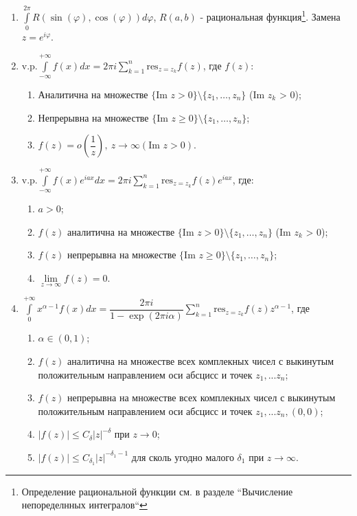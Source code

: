 \documentclass[a4paper,12pt]{scrartcl}
\newcommand{\res}{\text{res}}
\begin{document}
\begin{enumerate}
 \item $\int\limits_{0}^{2\pi}R(\sin(\varphi),\cos(\varphi))d\varphi$, $R(a,b)$ - рациональная функция\footnote{Определение рациональной функции см. в разделе ``Вычисление непоределнных интегралов``}. Замена $z=e^{i\varphi}$.
\item v.p.$\int\limits_{-\infty}^{+\infty}f(x)dx =2\pi i\sum\limits_{k=1}^{n}\res_{z=z_k}f(z)$, где $f(z)$:
\begin{enumerate}
\item Аналитична на множестве $\{\text{Im } z > 0\} \setminus \{z_1,\ldots,z_n\}$ (Im $z_k$ > 0);
\item Непрерывна на множестве $\{\text{Im } z \geqslant 0 \} \setminus \{z_1,\ldots,z_n\}$;
\item $f(z) = o\left(\dfrac{1}{z}\right),\ z\to\infty (\text{Im } z >0)$.
\end{enumerate}
\item v.p.$\int\limits_{-\infty}^{+\infty}f(x)e^{iax}dx =2\pi i\sum\limits_{k=1}^{n}\res_{z=z_k}f(z)e^{iax}$, где:
\begin{enumerate}
\item $a > 0$;
\item $f(z)$ аналитична на множестве $\{\text{Im } z > 0\} \setminus \{z_1,\ldots,z_n\}$ (Im $z_k$ > 0);
\item $f(z)$ непрерывна на множестве $\{\text{Im } z \geqslant 0 \} \setminus \{z_1,\ldots,z_n\}$;
\item $\lim\limits_{z\to \infty}f(z) = 0$.
\end{enumerate}
\item $\int\limits_{0}^{+\infty}x^{\alpha-1}f(x)dx = \dfrac{2\pi i}{1-\exp(2\pi i \alpha)} \sum\limits_{k=1}^{n}\res_{z=z_k}f(z)z^{\alpha-1}$, где
\begin{enumerate}
\item $\alpha \in (0,1)$;
\item $f(z)$ аналитична на множестве всех комплекных чисел с выкинутым положительным направлением оси абсцисс и точек $z_1,...z_n$;
\item $f(z)$ непрерывна на множестве всех комплекных чисел с выкинутым положительным направлением оси абсцисс и точек $z_1,...z_n,(0,0)$;
\item $|f(z)| \leqslant C_\delta|z|^{-\delta}$ при $z\to0$;
\item $|f(z)| \leqslant C_{\delta_1}|z|^{-\delta_1-1}$ для сколь угодно малого $\delta_1$ при $z\to\infty$.
\end{enumerate}
\end{enumerate}
\end{document}
